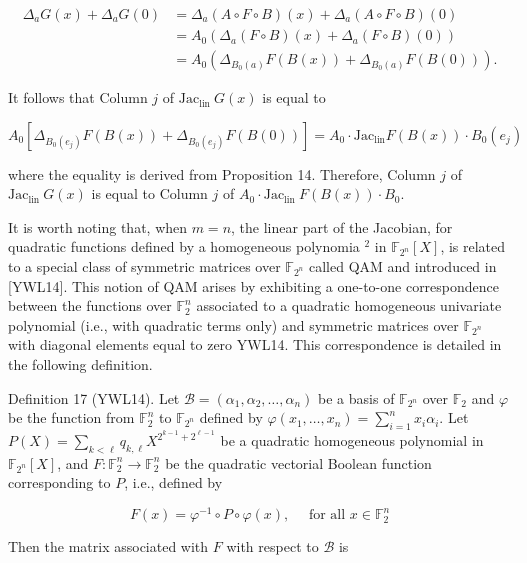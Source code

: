 \documentclass[10pt]{article}
\begin{document}
$$
\begin{aligned}
\Delta_{a} G(x)+\Delta_{a} G(0) & =\Delta_{a}(A \circ F \circ B)(x)+\Delta_{a}(A \circ F \circ B)(0) \\
& =A_{0}\left(\Delta_{a}(F \circ B)(x)+\Delta_{a}(F \circ B)(0)\right) \\
& =A_{0}\left(\Delta_{B_{0}(a)} F(B(x))+\Delta_{B_{0}(a)} F(B(0))\right) .
\end{aligned}
$$

It follows that Column $j$ of $\mathrm{Jac}_{\text {lin }} G(x)$ is equal to

$$
A_{0}\left[\Delta_{B_{0}\left(e_{j}\right)} F(B(x))+\Delta_{B_{0}\left(e_{j}\right)} F(B(0))\right]=A_{0} \cdot \mathrm{Jac}_{\operatorname{lin}} F(B(x)) \cdot B_{0}\left(e_{j}\right)
$$

where the equality is derived from Proposition 14. Therefore, Column $j$ of $\mathrm{Jac}_{\text {lin }} G(x)$ is equal to Column $j$ of $A_{0} \cdot \mathrm{Jac}_{\text {lin }} F(B(x)) \cdot B_{0}$.

It is worth noting that, when $m=n$, the linear part of the Jacobian, for quadratic functions defined by a homogeneous polynomia ${ }^{2}$ in $\mathbb{F}_{2^{n}}[X]$, is related to a special class of symmetric matrices over $\mathbb{F}_{2^{n}}$ called QAM and introduced in [YWL14]. This notion of QAM arises by exhibiting a one-to-one correspondence between the functions over $\mathbb{F}_{2}^{n}$ associated to a quadratic homogeneous univariate polynomial (i.e., with quadratic terms only) and symmetric matrices over $\mathbb{F}_{2^{n}}$ with diagonal elements equal to zero YWL14. This correspondence is detailed in the following definition.

Definition 17 (YWL14). Let $\mathcal{B}=\left(\alpha_{1}, \alpha_{2}, \ldots, \alpha_{n}\right)$ be a basis of $\mathbb{F}_{2^{n}}$ over $\mathbb{F}_{2}$ and $\varphi$ be the function from $\mathbb{F}_{2}^{n}$ to $\mathbb{F}_{2^{n}}$ defined by $\varphi\left(x_{1}, \ldots, x_{n}\right)=\sum_{i=1}^{n} x_{i} \alpha_{i}$. Let $P(X)=\sum_{k<\ell} q_{k, \ell} X^{2^{k-1}+2^{\ell-1}}$ be a quadratic homogeneous polynomial in $\mathbb{F}_{2^{n}}[X]$, and $F: \mathbb{F}_{2}^{n} \rightarrow \mathbb{F}_{2}^{n}$ be the quadratic vectorial Boolean function corresponding to $P$, i.e., defined by

$$
F(x)=\varphi^{-1} \circ P \circ \varphi(x), \quad \text { for all } x \in \mathbb{F}_{2}^{n}
$$

Then the matrix associated with $F$ with respect to $\mathcal{B}$ is
\end{document}

